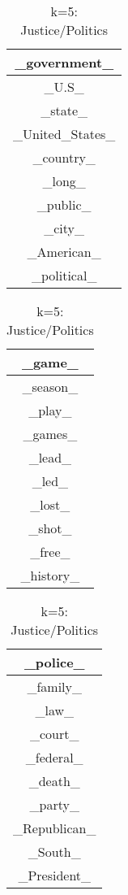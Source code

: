 \documentclass{article}
\begin{document}
\begin{table}[ht]
    \parbox{.25\linewidth}{
    \centering
    \begin{tabular}{|c|}
    \hline
    \_government\_\\
    \hline
    \_U.S\_\\
    \hline
    \_state\_\\
    \hline
    \_United\_States\_\\
    \hline
    \_country\_\\
    \hline
    \_long\_\\
    \hline
    \_public\_\\
    \hline
    \_city\_\\
    \hline
    \_American\_\\
    \hline
    \_political\_\\
    \hline
    \end{tabular}
    \caption{k=5: Government/Politics}
    }
    \hfill
    \parbox{.25\linewidth}{
    \centering
    \begin{tabular}{|c|}
    \hline
    \_game\_\\
    \hline
    \_season\_\\
    \hline
    \_play\_\\
    \hline
    \_games\_\\
    \hline
    \_lead\_\\
    \hline
    \_led\_\\
    \hline
    \_lost\_\\
    \hline
    \_shot\_\\
    \hline
    \_free\_\\
    \hline
    \_history\_\\
    \hline
    \end{tabular}
    \caption{k=5: Sports/Games}
    }
    \hfill
    \parbox{.25\linewidth}{
    \centering
    \begin{tabular}{|c|}
    \hline
    \_police\_\\
    \hline
    \_family\_\\
    \hline
    \_law\_\\
    \hline
    \_court\_\\
    \hline
    \_federal\_\\
    \hline
    \_death\_\\
    \hline
    \_party\_\\
    \hline
    \_Republican\_\\
    \hline
    \_South\_\\
    \hline
    \_President\_\\
    \hline
    \end{tabular}
    \caption{k=5: Justice/Politics}
    }
\end{table}\\
\end{document}
